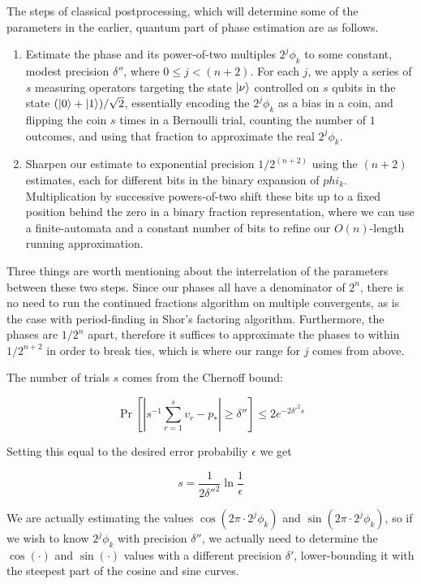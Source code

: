 The steps of classical postprocessing, which will determine some of the
parameters in the earlier, quantum part of phase estimation are as follows.

\begin{enumerate}

\item
Estimate the phase and its power-of-two multiples
$2^j \phi_k$ to
some constant, modest precision $\delta''$, where
$0 \le j < (n+2)$. For each $j$, we
apply a series of $s$ measuring operators targeting the state $\left\vert{\nu}\right\rangle$
controlled on $s$ qubits in the state $(\left\vert{0}\right\rangle+\left\vert{1}\right\rangle)/\sqrt{2}$,
essentially encoding the $2^j \phi_k$ as a bias in a coin, and flipping the
coin $s$ times in a Bernoulli trial, counting the number of $1$ outcomes,
and using that fraction to approximate the real $2^j \phi_k$.
\item
Sharpen our estimate to exponential precision $1/2^(n+2)$ using the
$(n+2)$ estimates, each for different bits in the binary expansion of
$phi_k$. Multiplication by successive powers-of-two shift these bits
up to a fixed position behind the zero in a binary fraction representation,
where we can use a finite-automata and a constant number of
bits to refine our $O(n)$-length running approximation.
\end{enumerate}

Three things are worth mentioning about the interrelation of the parameters
between these two steps. Since our phases all have a denominator of $2^n$,
there is no need to run the continued fractions algorithm on multiple
convergents, as is the case with period-finding in Shor's factoring algorithm.
Furthermore, the phases are $1/2^n$ apart, therefore it suffices to approximate
the phases to within $1/2^{n+2}$ in order to break ties, which is where
our range for $j$ comes from above.

The number of trials $s$ comes from the Chernoff bound:

\begin{displaymath}
\Pr \left[ | s^{-1}\sum_{r=1}^s v_r - p_* | \ge \delta'' \right]
\le 2e^{-2\delta'^2 s}
\end{displaymath}

Setting this equal to the desired error probabiliy $\epsilon$ we get

\begin{displaymath}
s = \frac{1}{2\delta''^2}\ln \frac{1}{\epsilon}
\end{displaymath}

We are actually estimating the values $\cos(2\pi \cdot 2^j \phi_k)$ and
$\sin(2\pi \cdot 2^j \phi_k)$, so if we wish to know $2^j \phi_k$ with
precision $\delta''$, we actually need to determine the $\cos(\cdot)$ and
$\sin(\cdot)$ values with a different precision $\delta'$, lower-bounding
it with the steepest part of the cosine and sine curves.

